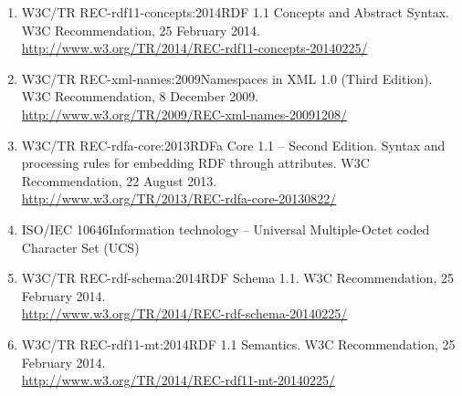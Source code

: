 \documentclass[10pt,fleqn,%
\ifpretendfinal
final%
\else
draft%
\fi,
]{scrreprt}
\begin{document}
\begin{enumerate}
  \item{W3C/TR REC-rdf11-concepts:2014}{RDF 1.1 Concepts and Abstract Syntax.  W3C Recommendation, 25 February 2014. \\ \url{http://www.w3.org/TR/2014/REC-rdf11-concepts-20140225/}}
  \item{W3C/TR REC-xml-names:2009}{Namespaces in XML 1.0 (Third Edition). W3C Recommendation, 8 December 2009.\\
   \url{http://www.w3.org/TR/2009/REC-xml-names-20091208/}}
  \item{W3C/TR REC-rdfa-core:2013}{RDFa Core 1.1 -- Second Edition.  Syntax and processing rules for embedding RDF through attributes. W3C Recommendation, 22 August 2013.\\ \url{http://www.w3.org/TR/2013/REC-rdfa-core-20130822/}}
  \item{ISO/IEC 10646}{Information technology – Universal Multiple-Octet coded Character Set (UCS)}
  \item{W3C/TR REC-rdf-schema:2014}{RDF Schema 1.1. W3C Recommendation, 25 February 2014.\\ \url{http://www.w3.org/TR/2014/REC-rdf-schema-20140225/}}
  \item{W3C/TR REC-rdf11-mt:2014}{RDF 1.1 Semantics.  W3C Recommendation, 25 February 2014. \\ \url{http://www.w3.org/TR/2014/REC-rdf11-mt-20140225/}}


\end{enumerate}
\end{document}
